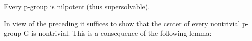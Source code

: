Every p-group is nilpotent (thus supersolvable).

In view of the preceding it suffices to show that the center of every nontrivial p-group G is nontrivial. This is a consequence of the following lemma:
